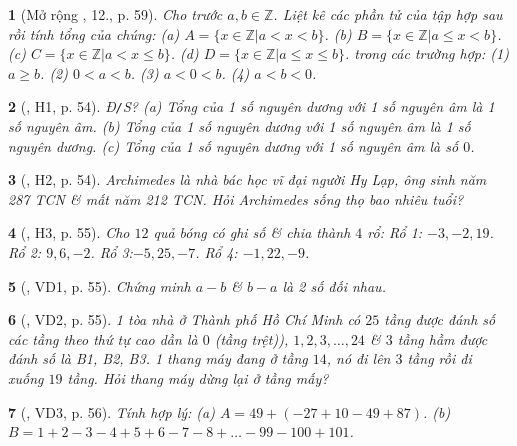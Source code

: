 \documentclass{article}
\newtheorem{baitoan}{}
\begin{document}
\begin{baitoan}[Mở rộng \cite{Trong_Toan_6_2021}, 12., p. 59]
	Cho trước $a,b\in\mathbb{Z}$. Liệt kê các phần tử của tập hợp sau rồi tính tổng của chúng: (a) $A = \{x\in\mathbb{Z}|a < x < b\}$. (b) $B = \{x\in\mathbb{Z}|a\le x < b\}$. (c) $C = \{x\in\mathbb{Z}|a < x\le b\}$. (d) $D = \{x\in\mathbb{Z}|a\le x\le b\}$. trong các trường hợp: (1) $a\ge b$. (2) $0 < a < b$. (3) $a < 0 < b$. (4) $a < b < 0$.
\end{baitoan}

\begin{baitoan}[\cite{Binh_boi_duong_Toan_6_tap_1}, H1, p. 54]
	{\rm Đ{\tt/}S?} (a) Tổng của 1 số nguyên dương với 1 số nguyên âm là 1 số nguyên âm. (b) Tổng của 1 số nguyên dương với 1 số nguyên âm là 1 số nguyên dương. (c) Tổng của 1 số nguyên dương với 1 số nguyên âm là số $0$.
\end{baitoan}

\begin{baitoan}[\cite{Binh_boi_duong_Toan_6_tap_1}, H2, p. 54]
	Archimedes là nhà bác học vĩ đại người Hy Lạp, ông sinh năm {\rm287 TCN} \& mất năm {\rm212 TCN}. Hỏi Archimedes sống thọ bao nhiêu tuổi?
\end{baitoan}

\begin{baitoan}[\cite{Binh_boi_duong_Toan_6_tap_1}, H3, p. 55]
	Cho $12$ quả bóng có ghi số \& chia thành $4$ rổ: Rổ 1: $-3,-2,19$. Rổ 2: $9,6,-2$. Rổ 3:$-5,25,-7$. Rổ 4: $-1,22,-9$.
\end{baitoan}

\begin{baitoan}[\cite{Binh_boi_duong_Toan_6_tap_1}, VD1, p. 55]
	Chứng minh $a - b$ \& $b - a$ là 2 số đối nhau.
\end{baitoan}

\begin{baitoan}[\cite{Binh_boi_duong_Toan_6_tap_1}, VD2, p. 55]
	1 tòa nhà ở Thành phố Hồ Chí Minh có $25$ tầng được đánh số các tầng theo thứ tự cao dần là $0$ (tầng trệt)), $1,2,3,\ldots,24$ \& $3$ tầng hầm được đánh số là B1, B2, B3. 1 thang máy đang ở tầng $14$, nó đi lên $3$ tầng rồi đi xuống $19$ tầng. Hỏi thang máy dừng lại ở tầng mấy?
\end{baitoan}

\begin{baitoan}[\cite{Binh_boi_duong_Toan_6_tap_1}, VD3, p. 56]
	Tính hợp lý: (a) $A = 49 + (-27 + 10 - 49 + 87)$. (b) $B = 1 + 2 - 3 - 4 + 5 + 6 - 7 - 8 + \ldots - 99 - 100 + 101$.
\end{baitoan}
\end{document}
